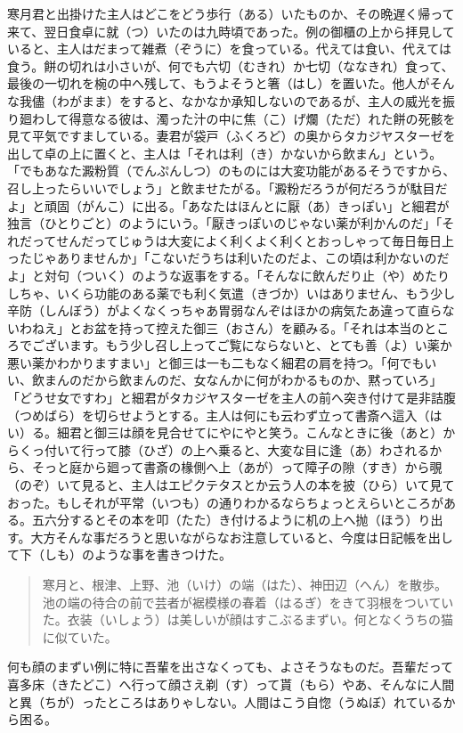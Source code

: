 \documentclass{book}
\begin{document}
寒月君と出掛けた主人はどこをどう歩行（ある）いたものか、その晩遅く帰って来て、翌日食卓に就（つ）いたのは九時頃であった。例の御櫃の上から拝見していると、主人はだまって雑煮（ぞうに）を食っている。代えては食い、代えては食う。餅の切れは小さいが、何でも六切（むきれ）か七切（ななきれ）食って、最後の一切れを椀の中へ残して、もうよそうと箸（はし）を置いた。他人がそんな我儘（わがまま）をすると、なかなか承知しないのであるが、主人の威光を振り廻わして得意なる彼は、濁った汁の中に焦（こ）げ爛（ただ）れた餅の死骸を見て平気ですましている。妻君が袋戸（ふくろど）の奥からタカジヤスターゼを出して卓の上に置くと、主人は「それは利（き）かないから飲まん」という。「でもあなた澱粉質（でんぷんしつ）のものには大変功能があるそうですから、召し上ったらいいでしょう」と飲ませたがる。「澱粉だろうが何だろうが駄目だよ」と頑固（がんこ）に出る。「あなたはほんとに厭（あ）きっぽい」と細君が独言（ひとりごと）のようにいう。「厭きっぽいのじゃない薬が利かんのだ」「それだってせんだってじゅうは大変によく利くよく利くとおっしゃって毎日毎日上ったじゃありませんか」「こないだうちは利いたのだよ、この頃は利かないのだよ」と対句（ついく）のような返事をする。「そんなに飲んだり止（や）めたりしちゃ、いくら功能のある薬でも利く気遣（きづか）いはありません、もう少し辛防（しんぼう）がよくなくっちゃあ胃弱なんぞはほかの病気たあ違って直らないわねえ」とお盆を持って控えた御三（おさん）を顧みる。「それは本当のところでございます。もう少し召し上ってご覧にならないと、とても善（よ）い薬か悪い薬かわかりますまい」と御三は一も二もなく細君の肩を持つ。「何でもいい、飲まんのだから飲まんのだ、女なんかに何がわかるものか、黙っていろ」「どうせ女ですわ」と細君がタカジヤスターゼを主人の前へ突き付けて是非詰腹（つめばら）を切らせようとする。主人は何にも云わず立って書斎へ這入（はい）る。細君と御三は顔を見合せてにやにやと笑う。こんなときに後（あと）からくっ付いて行って膝（ひざ）の上へ乗ると、大変な目に逢（あ）わされるから、そっと庭から廻って書斎の椽側へ上（あが）って障子の隙（すき）から覗（のぞ）いて見ると、主人はエピクテタスとか云う人の本を披（ひら）いて見ておった。もしそれが平常（いつも）の通りわかるならちょっとえらいところがある。五六分するとその本を叩（たた）き付けるように机の上へ抛（ほう）り出す。大方そんな事だろうと思いながらなお注意していると、今度は日記帳を出して下（しも）のような事を書きつけた。

\blockquote{寒月と、根津、上野、池（いけ）の端（はた）、神田辺（へん）を散歩。池の端の待合の前で芸者が裾模様の春着（はるぎ）をきて羽根をついていた。衣装（いしょう）は美しいが顔はすこぶるまずい。何となくうちの猫に似ていた。}

何も顔のまずい例に特に吾輩を出さなくっても、よさそうなものだ。吾輩だって喜多床（きたどこ）へ行って顔さえ剃（す）って貰（もら）やあ、そんなに人間と異（ちが）ったところはありゃしない。人間はこう自惚（うぬぼ）れているから困る。
\end{document}
